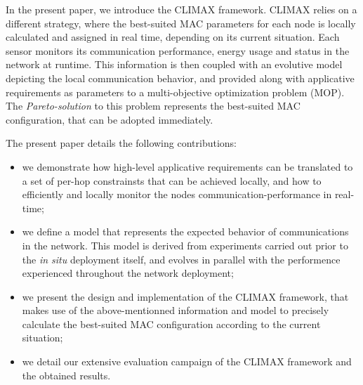 \documentclass[12pt,journal,compsoc]{IEEEtran}
\begin{document}

In the present paper, we introduce the CLIMAX framework. CLIMAX relies on a different strategy, where the best-suited MAC parameters for each node is locally calculated and assigned in real time, depending on its current situation. Each sensor monitors its communication performance, energy usage and status in the network at runtime. This information is then coupled with an evolutive model depicting the local communication behavior, and provided along with applicative requirements as parameters to a multi-objective optimization problem (MOP). The \textit{Pareto-solution} to this problem represents the best-suited MAC configuration, that can be adopted immediately.

The present paper details the following contributions:

\begin{itemize}
	\item we demonstrate how high-level applicative requirements can be translated to a set of per-hop constrainsts that can be achieved locally, and how to efficiently and locally monitor the nodes communication-performance in real-time;
	\item we define a model that represents the expected behavior of communications in the network. This model is derived from experiments carried out prior to the \textit{in situ} deployment itself, and evolves in parallel with the performence experienced throughout the network deployment;
	\item we present the design and implementation of the CLIMAX framework, that makes use of the above-mentionned information and model to precisely calculate the best-suited MAC configuration according to the current situation;
	\item we detail our extensive evaluation campaign of the CLIMAX framework and the obtained results.
\end{itemize}
\end{document}
